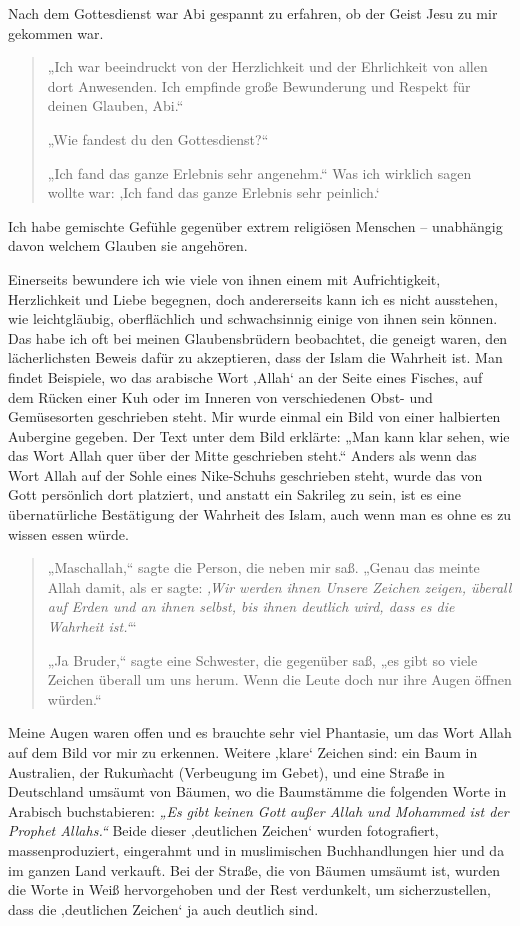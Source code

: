 \documentclass[12pt]{memoir}
\begin{document}
Nach dem Gottesdienst war Abi gespannt zu erfahren,
ob der Geist Jesu zu mir gekommen war.

\begin{quote}
„Ich war beeindruckt von der Herzlichkeit
und der Ehrlichkeit von allen dort Anwesenden.
Ich empfinde große Bewunderung und Respekt für deinen Glauben, Abi.“

„Wie fandest du den Gottesdienst?“

„Ich fand das ganze Erlebnis sehr angenehm.“
Was ich wirklich sagen wollte war:
‚Ich fand das ganze Erlebnis sehr peinlich.‘
\end{quote}

Ich habe gemischte Gefühle gegenüber extrem religiösen Menschen –
unabhängig davon welchem Glauben sie angehören.

Einerseits bewundere ich wie viele von ihnen einem
mit Aufrichtigkeit, Herzlichkeit und Liebe begegnen,
doch andererseits kann ich es nicht ausstehen,
wie leichtgläubig, oberflächlich und schwachsinnig
einige von ihnen sein können.
Das habe ich oft bei meinen Glaubensbrüdern beobachtet,
die geneigt waren, den lächerlichsten Beweis dafür zu akzeptieren,
dass der Islam die Wahrheit ist.
Man findet Beispiele, wo das arabische Wort ‚Allah‘
an der Seite eines Fisches, auf dem Rücken einer Kuh
oder im Inneren von verschiedenen Obst- und Gemüsesorten geschrieben steht.
Mir wurde einmal ein Bild von einer halbierten Aubergine gegeben.
Der Text unter dem Bild erklärte:
„Man kann klar sehen,
wie das Wort Allah quer über der Mitte geschrieben steht.“
Anders als wenn das Wort Allah auf der Sohle
eines Nike-Schuhs geschrieben steht,
wurde das von Gott persönlich dort platziert,
und anstatt ein Sakrileg zu sein,
ist es eine übernatürliche Bestätigung der Wahrheit des Islam,
auch wenn man es ohne es zu wissen essen würde.

\begin{quote}
„Maschallah,“ sagte die Person, die neben mir saß.
„Genau das meinte Allah damit, als er sagte:
\emph{‚Wir werden ihnen Unsere Zeichen zeigen, überall auf Erden und an ihnen selbst, bis ihnen deutlich wird, dass es die Wahrheit ist.‘}“

„Ja Bruder,“ sagte eine Schwester, die gegenüber saß,
„es gibt so viele Zeichen überall um uns herum.
Wenn die Leute doch nur ihre Augen öffnen würden.“
\end{quote}

Meine Augen waren offen und es brauchte sehr viel Phantasie,
um das Wort Allah auf dem Bild vor mir zu erkennen.
Weitere ‚klare‘ Zeichen sind: ein Baum in Australien,
der Ruku\` macht (Verbeugung im Gebet),
und eine Straße in Deutschland umsäumt von Bäumen,
wo die Baumstämme die folgenden Worte in Arabisch buchstabieren:
\emph{„Es gibt keinen Gott außer Allah
und Mohammed ist der Prophet Allahs.“}
Beide dieser ‚deutlichen Zeichen‘ wurden fotografiert,
massenproduziert, eingerahmt und in muslimischen Buchhandlungen
hier und da im ganzen Land verkauft.
Bei der Straße, die von Bäumen umsäumt ist,
wurden die Worte in Weiß hervorgehoben und der Rest verdunkelt,
um sicherzustellen, dass die ‚deutlichen Zeichen‘ ja auch deutlich sind.
\end{document}
